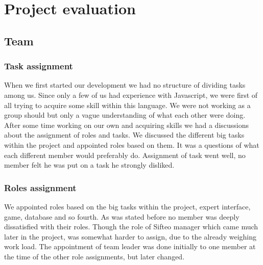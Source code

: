 \chapter{Project evaluation}

\section{Team}

\subsection*{Task assignment}
When we first started our development we had no structure of dividing tasks among us. Since only a few of us had experience with Javascript, we were first of all trying to acquire some skill within this language. We were not working as a group should but only a vague understanding of what each other were doing. After some time working on our own and acquiring skills we had a discussions about the assignment of roles and tasks. We discussed the different big tasks within the project and appointed roles based on them. It was a questions of what each different member would preferably do. Assignment of task went well, no member felt he was put on a task he strongly disliked.

\subsection*{Roles assignment}
We appointed roles based on the big tasks within the project, expert interface, game, database and so fourth. As was stated before no member was deeply dissatisfied with their roles. Though the role of Sifteo manager which came much later in the project, was somewhat harder to assign, due to the already weighing work load. The appointment of team leader was done initially to one member at the time of the other role assignments, but later changed. 

